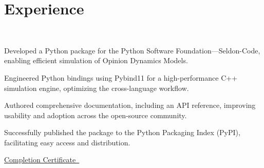 \documentclass[]{resume}
\begin{document}
%
%
\lastupdated

%
%

%
%

\begin{minipage}[t]{0.60\textwidth}


\section{Experience}
\\
\vspace{\topsep}
\begin{tightemize}
\item Developed a Python package for the Python Software Foundation—Seldon-Code, enabling efficient simulation of Opinion Dynamics Models.
\item Engineered Python bindings using Pybind11 for a high-performance C++ simulation engine, optimizing the cross-language workflow.
\item Authored comprehensive documentation, including an API reference, improving usability and adoption across the open-source community.
\item Successfully published the package to the Python Packaging Index (PyPI), facilitating easy access and distribution.
\item \href{https://github.com/User-DK/Resume/blob/main/assets/gsoc_completion_certificate_2024.jpg}{Completion Certificate\faLink\ }
\end{tightemize}
\sectionsep


\end{minipage}
\end{document}
